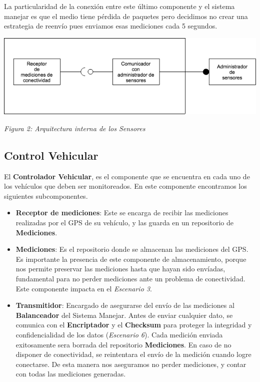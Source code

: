 La particularidad de la conexión entre este último componente y el sistema
manejar es que el medio tiene pérdida de paquetes pero decidimos no crear una 
estrategia de reenvío pues enviamos esas mediciones cada 5 segundos.

\begin{center}
  \includegraphics[width=1\textwidth]{./imagenes/arquitectura_tp2/sensor.png}
  \centerline{\textit{Figura 2: Arquitectura interna de los Sensores}}
\end{center}


\subsection{Control Vehicular}

El \textbf{Controlador Vehicular}, es el componente que se encuentra en cada uno de los vehículos
que deben ser monitoreados. En este componente encontramos los siguientes subcomponentes.

\begin{itemize}
\item \textbf{Receptor de mediciones}: Este se encarga de recibir las mediciones realizadas por el GPS de su vehículo,
 y las guarda en un repositorio de \textbf{Mediciones}.
 
\item \textbf{Mediciones}: Es el repositorio donde se almacenan las mediciones del GPS.
 Es importante la presencia de este componente de almacenamiento, porque nos permite preservar
las mediciones hasta que hayan sido envíadas, fundamental para no perder mediciones ante un
problema de conectividad. Este componente impacta en el \textit{Escenario 3}.

\item \textbf{Transmitidor}: Encargado de asegurarse del envío de las mediciones al \textbf{Balanceador}
del Sistema Manejar. Antes de enviar cualquier dato, se comunica con el \textbf{Encriptador} y el
\textbf{Checksum} para proteger la integridad y confidencialidad de los datos (\textit{Escenario 
6}).
Cada medición enviada exitosamente sera borrada del repositorio \textbf{Mediciones}.
En caso de no disponer de conectividad, se reintentara el envío de la medición cuando logre conectarse.
De esta manera nos aseguramos no perder mediciones, y contar con todas las mediciones generadas.
\end{itemize}

